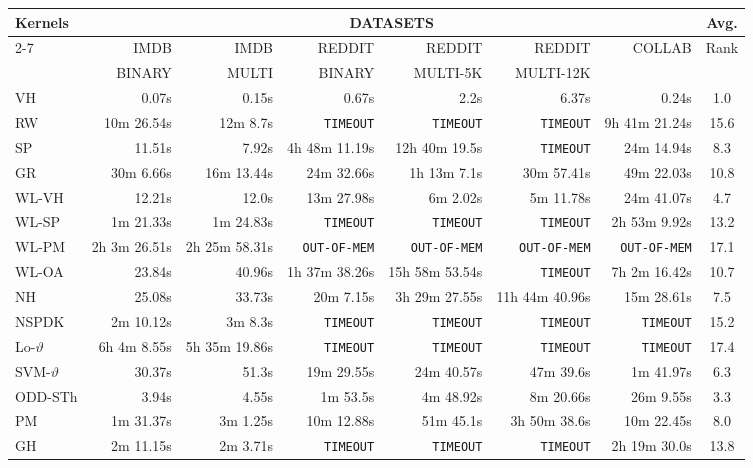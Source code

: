 \documentclass[twoside,11pt]{article}
\begin{document}
\begin{table}[t]
\centering
\scriptsize
\def\arraystretch{1.05}
\resizebox{\textwidth}{!} {
\begin{tabular}{lrrrrrrc} \toprule
\multirow{3}{*}{Kernels} & \multicolumn{6}{c}{DATASETS} & \multirow{2}{*}{Avg.} \\ \cline{2-7}
& IMDB & IMDB & REDDIT & REDDIT & REDDIT & \multirow{2}{*}{COLLAB} & \multirow{2}{*}{Rank}\\
& BINARY & MULTI & BINARY & MULTI-5K & MULTI-12K & & \\ 
\midrule
VH & 0.07s & 0.15s & 0.67s & 2.2s & 6.37s & 0.24s & 1.0 \\ 
RW & 10m 26.54s & 12m 8.7s & \texttt{TIMEOUT} & \texttt{TIMEOUT} & \texttt{TIMEOUT} & 9h 41m 21.24s & 15.6 \\ 
SP & 11.51s & 7.92s & 4h 48m 11.19s & 12h 40m 19.5s & \texttt{TIMEOUT} & 24m 14.94s & 8.3 \\ 
GR & 30m 6.66s & 16m 13.44s & 24m 32.66s & 1h 13m 7.1s & 30m 57.41s & 49m 22.03s & 10.8 \\ 
WL-VH & 12.21s & 12.0s & 13m 27.98s & 6m 2.02s & 5m 11.78s & 24m 41.07s & 4.7 \\ 
WL-SP & 1m 21.33s & 1m 24.83s & \texttt{TIMEOUT} & \texttt{TIMEOUT} & \texttt{TIMEOUT} & 2h 53m 9.92s & 13.2 \\ 
WL-PM & 2h 3m 26.51s & 2h 25m 58.31s & \texttt{OUT-OF-MEM} & \texttt{OUT-OF-MEM} & \texttt{OUT-OF-MEM} & \texttt{OUT-OF-MEM} & 17.1 \\ 
WL-OA & 23.84s & 40.96s & 1h 37m 38.26s & 15h 58m 53.54s & \texttt{TIMEOUT} & 7h 2m 16.42s & 10.7 \\ 
NH & 25.08s & 33.73s & 20m 7.15s & 3h 29m 27.55s & 11h 44m 40.96s & 15m 28.61s & 7.5 \\ 
NSPDK & 2m 10.12s & 3m 8.3s & \texttt{TIMEOUT} & \texttt{TIMEOUT} & \texttt{TIMEOUT} & \texttt{TIMEOUT} & 15.2 \\ 
Lo-$\vartheta$  & 6h 4m 8.55s & 5h 35m 19.86s & \texttt{TIMEOUT} & \texttt{TIMEOUT} & \texttt{TIMEOUT} & \texttt{TIMEOUT} & 17.4 \\ 
SVM-$\vartheta$ & 30.37s & 51.3s & 19m 29.55s & 24m 40.57s & 47m 39.6s & 1m 41.97s & 6.3 \\ 
ODD-STh & 3.94s & 4.55s & 1m 53.5s & 4m 48.92s & 8m 20.66s & 26m 9.55s & 3.3 \\ 
PM & 1m 31.37s & 3m 1.25s & 10m 12.88s & 51m 45.1s & 3h 50m 38.6s & 10m 22.45s & 8.0 \\ 
GH & 2m 11.15s & 2m 3.71s & \texttt{TIMEOUT} & \texttt{TIMEOUT} & \texttt{TIMEOUT} & 2h 19m 30.0s & 13.8 \\ 

\end{tabular}}
\end{table}
\end{document}
